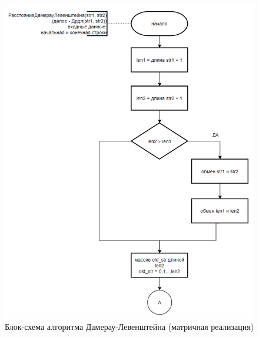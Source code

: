 \begin{figure}[H]
    \centering
    \includegraphics[width=1.05\textwidth]{img/block_2_1_1.png}
    \caption{Блок-схема алгоритма Дамерау-Левенштейна (матричная реализация)}
    \label{fig:block_2_1_1}
\end{figure}

